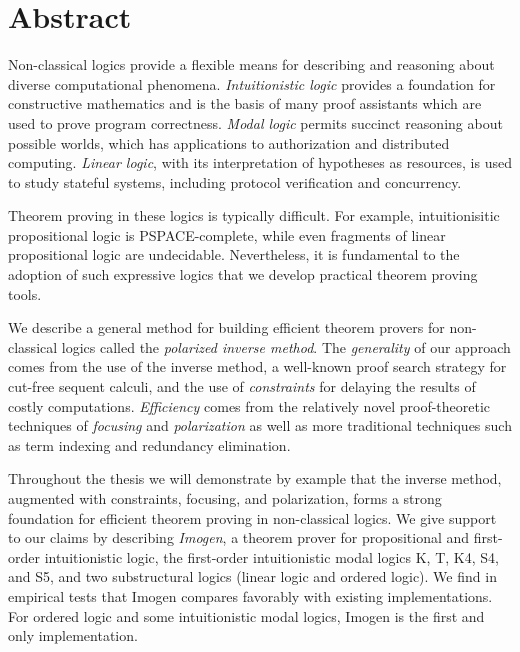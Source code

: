 
\chapter*{Abstract}

Non-classical logics provide a flexible means for describing and reasoning about
diverse computational phenomena.  \emph{Intuitionistic logic} provides a
foundation for constructive mathematics and is the basis of many proof
assistants which are used to prove program correctness.  \emph{Modal logic}
permits succinct reasoning about possible worlds, which has applications to
authorization and distributed computing.  \emph{Linear logic}, with its
interpretation of hypotheses as resources, is used to study stateful systems,
including protocol verification and concurrency.

Theorem proving in these logics is typically difficult. For example,
intuitionisitic propositional logic is PSPACE-complete, while even fragments of
linear propositional logic are undecidable.  Nevertheless, it is fundamental to
the adoption of such expressive logics that we develop practical theorem proving
tools.

We describe a general method for building efficient theorem provers for
non-classical logics called the \emph{polarized inverse method}.  The
\emph{generality} of our approach comes from the use of the inverse method, a
well-known proof search strategy for cut-free sequent calculi, and the use of
\emph{constraints} for delaying the results of costly computations.
\emph{Efficiency} comes from the relatively novel proof-theoretic techniques of
\emph{focusing} and \emph{polarization} as well as more traditional techniques
such as term indexing and redundancy elimination.

Throughout the thesis we will demonstrate by example that the inverse method,
augmented with constraints, focusing, and polarization, forms a strong
foundation for efficient theorem proving in non-classical logics.  We give
support to our claims by describing \emph{Imogen}, a theorem prover for
propositional and first-order intuitionistic logic, the first-order
intuitionistic modal logics K, T, K4, S4, and S5, and two substructural logics
(linear logic and ordered logic).  We find in empirical tests that Imogen
compares favorably with existing implementations.  For ordered logic and some
intuitionistic modal logics, Imogen is the first and only implementation.

